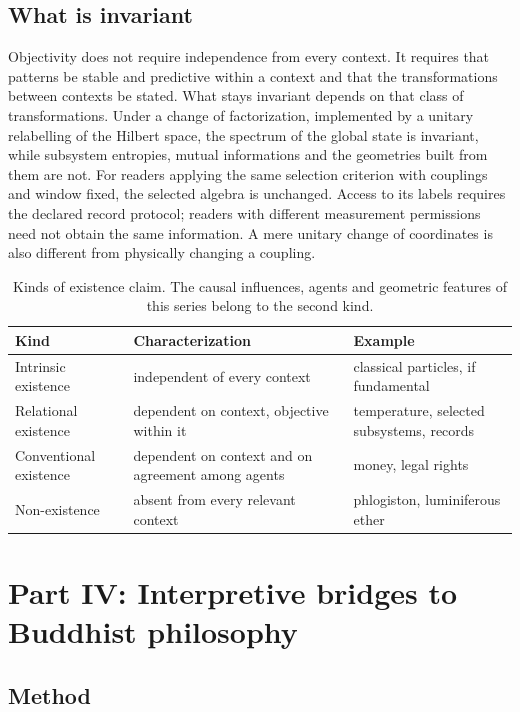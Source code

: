 \documentclass[11pt,a4paper]{article}
\begin{document}
\subsection{What is invariant}

Objectivity does not require independence from every context. It requires that patterns be stable and predictive within a context and that the transformations between contexts be stated. What stays invariant depends on that class of transformations. Under a change of factorization, implemented by a unitary relabelling of the Hilbert space, the spectrum of the global state is invariant, while subsystem entropies, mutual informations and the geometries built from them are not. For readers applying the same selection criterion with couplings and
window fixed, the selected algebra is unchanged. Access to its labels
requires the declared record protocol; readers with different measurement
permissions need not obtain the same information. A mere unitary change
of coordinates is also different from physically changing a coupling.

\begin{table}[ht]
\centering
\small
\begin{tabular}{P{3.3cm}P{5.2cm}P{4.8cm}}
\toprule
Kind & Characterization & Example\\
\midrule
Intrinsic existence & independent of every context & classical particles, if fundamental\\
Relational existence & dependent on context, objective within it & temperature, selected subsystems, records\\
Conventional existence & dependent on context and on agreement among agents & money, legal rights\\
Non-existence & absent from every relevant context & phlogiston, luminiferous ether\\
\bottomrule
\end{tabular}
\caption{Kinds of existence claim. The causal influences, agents and geometric features of this series belong to the second kind.}
\label{tab:existence}
\end{table}

\section{Part IV: Interpretive bridges to Buddhist philosophy}
\label{sec:bridges}

\subsection{Method}
\end{document}
